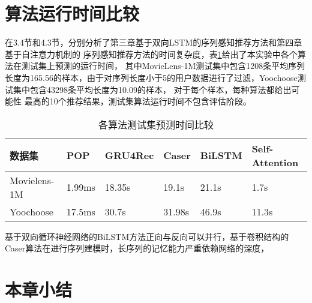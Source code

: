 



\section{算法运行时间比较}

在3.4节和4.3节，分别分析了第三章基于双向LSTM的序列感知推荐方法和第四章基于自注意力机制的%
序列感知推荐方法的时间复杂度，表\ref{tab:runtime}给出了本实验中各个算法在测试集上预测的运行时间，%
其中MovieLens-1M测试集中包含1208条平均序列长度为165.56的样本，由于对序列长度小于5的用户数据进行了过滤，Yoochoose测试集中包含43298条平均长度为10.09的样本，
对于每个样本，每种算法都给出可能性
最高的10个推荐结果，测试集算法运行时间不包含评估阶段。
\begin{table}[]
\centering
\caption{各算法测试集预测时间比较}
\label{tab:runtime}
\begin{tabular}{@{}llllll@{}}
数据集          & POP  & GRU4Rec & Caser & BiLSTM & Self-Attention \\ \midrule
Movielens-1M & 1.99ms &  18.35s  & 19.1s &  21.1s   &    1.7s         \\ \bottomrule
Yoochoose    & 17.5ms &  30.7s   & 31.98s &  46.9s  &    11.3s      
\end{tabular}
\end{table}
基于双向循环神经网络的BiLSTM方法正向与反向可以并行，基于卷积结构的Caser算法在进行序列建模时，长序列的记忆能力严重依赖网络的深度，

\section{本章小结}



